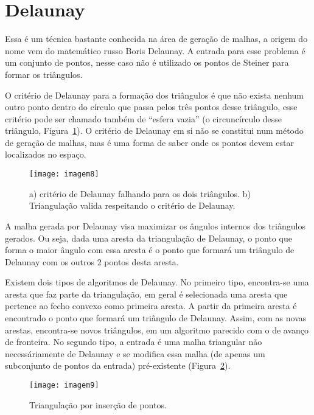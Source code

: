 \section{Delaunay}

Essa é um técnica bastante conhecida na área de geração de malhas, a origem do nome vem do matemático russo Boris Delaunay. A entrada para esse problema é um conjunto de pontos, nesse caso não é utilizado os pontos de Steiner para formar os triângulos.

O critério de Delaunay para a formação dos triângulos é que não exista nenhum outro ponto dentro do círculo que passa pelos três pontos desse triângulo, esse critério pode ser chamado também de “esfera vazia” (o circuncírculo desse triângulo, Figura~\ref{fig:imagem8}). O critério de Delaunay em si não se constitui num método de geração de malhas, mas é uma forma de saber onde os pontos devem estar localizados no espaço.

 \begin{figure}[htbp]
     \centering
     \texttt{[image: imagem8]}
     \caption{a) critério de Delaunay falhando para os dois triângulos. b) Triangulação valida respeitando o critério de Delaunay.} 
     \label{fig:imagem8}
 \end{figure}

A malha gerada por Delaunay visa maximizar os ângulos internos dos triângulos gerados. Ou seja, dada uma aresta da triangulação de Delaunay, o ponto que forma o maior ângulo com essa aresta é o ponto que formará um triângulo de Delaunay com os outros 2 pontos desta aresta.

Existem dois tipos de algoritmos de Delaunay. No primeiro tipo, encontra-se uma aresta que faz parte da triangulação, em geral é selecionada uma aresta que pertence ao fecho convexo como primeira aresta. A partir da primeira aresta é encontrado o ponto que formará um triângulo de Delaunay. Assim, com as novas arestas, encontra-se novos triângulos, em um algoritmo parecido com o de avanço de fronteira. No segundo tipo, a entrada é uma malha triangular não necessáriamente de Delaunay e se modifica essa malha (de apenas um subconjunto de pontos da entrada) pré-existente (Figura~\ref{fig:imagem9}).

 \begin{figure}[htbp]
     \centering
     \texttt{[image: imagem9]}
     \caption{Triangulação por inserção de pontos. \cite{bib:Freitas10}} 
     \label{fig:imagem9}
 \end{figure}

